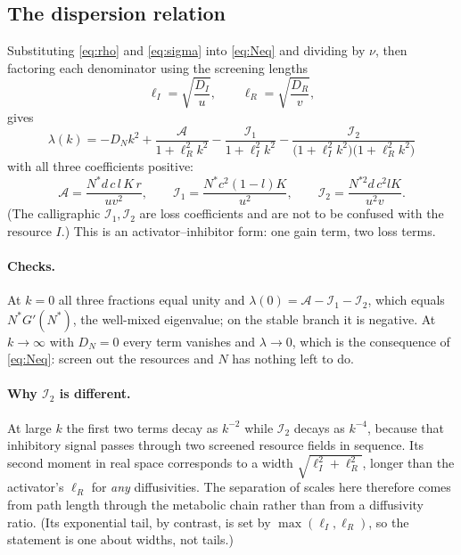 \documentclass[11pt,a4paper]{article}
\newcommand{\Ns}{N^{*}}
\newcommand{\Ai}{\mathcal{A}}
\newcommand{\Ione}{\mathcal{I}_1}
\newcommand{\Itwo}{\mathcal{I}_2}
\newcommand{\lI}{\ell_I}
\newcommand{\lR}{\ell_R}
\theoremstyle{plain}
\theoremstyle{remark}
\begin{document}
\subsection{The dispersion relation}

Substituting \eqref{eq:rho} and \eqref{eq:sigma} into \eqref{eq:Neq} and
dividing by $\nu$, then factoring each denominator using the screening lengths
\begin{equation}
\lI = \sqrt{\frac{D_I}{u}}, \qquad \lR = \sqrt{\frac{D_R}{v}},
\end{equation}
gives
\begin{equation}
\boxed{\;
\lambda(k) = -D_Nk^2
+ \frac{\Ai}{1+\lR^2k^2}
- \frac{\Ione}{1+\lI^2k^2}
- \frac{\Itwo}{\bigl(1+\lI^2k^2\bigr)\bigl(1+\lR^2k^2\bigr)}\;}
\label{eq:dispersion}
\end{equation}
with all three coefficients positive:
\begin{equation}
\Ai = \frac{\Ns d\,c\,l\,K\,r}{u v^2},\qquad
\Ione = \frac{\Ns c^2(1-l)K}{u^2},\qquad
\Itwo = \frac{N^{*2} d\,c^2 l K}{u^2 v}.
\label{eq:coeffs}
\end{equation}
(The calligraphic $\Ione,\Itwo$ are loss coefficients and are not to be confused
with the resource $I$.) This is an activator--inhibitor form: one gain term, two
loss terms.

\paragraph{Checks.} At $k=0$ all three fractions equal unity and
$\lambda(0)=\Ai-\Ione-\Itwo$, which equals $\Ns G'(\Ns)$, the well-mixed
eigenvalue; on the stable branch it is negative. At $k\to\infty$ with $D_N=0$
every term vanishes and $\lambda\to0$, which is the consequence of
\eqref{eq:Neq}: screen out the resources and $N$ has nothing left to do.

\paragraph{Why $\Itwo$ is different.} At large $k$ the first two terms decay as
$k^{-2}$ while $\Itwo$ decays as $k^{-4}$, because that inhibitory signal passes
through two screened resource fields in sequence. Its second moment in real
space corresponds to a width $\sqrt{\lI^2+\lR^2}$, longer than the activator's
$\lR$ for \emph{any} diffusivities. The separation of scales here therefore
comes from path length through the metabolic chain rather than from a
diffusivity ratio. (Its exponential tail, by contrast, is set by
$\max(\lI,\lR)$, so the statement is one about widths, not tails.)
\end{document}
